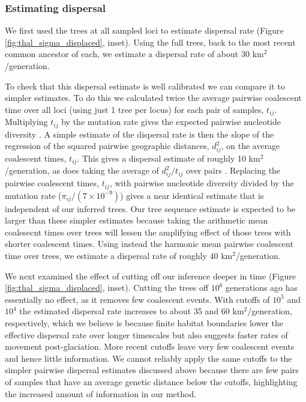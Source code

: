 \documentclass[12pt]{article}
\begin{document}
\subsubsection*{Estimating dispersal}

We first used the trees at all sampled loci to estimate dispersal rate (Figure \ref{fig:thal_sigma_displaced}, inset). 
Using the full trees, back to the most recent common ancestor of each, we estimate a dispersal rate of about $30$ km$^2$/generation. 

To check that this dispersal estimate is well calibrated we can compare it to simpler estimates. 
To do this we calculated twice the average pairwise coalescent time over all loci (using just 1 tree per locus) for each pair of samples, $t_{ij}$.
Multiplying $t_{ij}$ by the mutation rate gives the expected pairwise nucleotide diversity \citep{ralph2020efficiently}.
A simple estimate of the dispersal rate is then the slope of the regression of the squared pairwise geographic distances, $d_{ij}^2$, on the average coalescent times, $t_{ij}$.
This gives a dispersal estimate of roughly 10 km$^2$/generation, as does taking the average of $d_{ij}^2/t_{ij}$ over pairs \citep{ianni2023exploring}.
Replacing the pairwise coalescent times, $t_{ij}$, with pairwise nucleotide diversity divided by the mutation rate ($\pi_{ij}/(7\times10^{-9})$) gives a near identical estimate that is independent of our inferred trees.
Our tree sequence estimate is expected to be larger than these simpler estimates because taking the arithmetic mean coalesecnt times over trees will lessen the amplifying effect of those trees with shorter coalescent times. 
Using instead the harmonic mean pairwise coalescent time over trees, we estimate a dispersal rate of roughly 40 km$^2$/generation. 

We next examined the effect of cutting off our inference deeper in time (Figure \ref{fig:thal_sigma_displaced}, inset). 
Cutting the trees off $10^6$ generations ago has essentially no effect, as it removes few coalescent events.
With cutoffs of $10^5$ and $10^4$ the estimated dispersal rate increases to about 35 and 60 km$^2$/generation, respectively, which we believe is because finite habitat boundaries lower the effective dispersal rate over longer timescales but also suggests faster rates of movement post-glaciation.
More recent cutoffs leave very few coalescent events and hence little information. 
We cannot reliably apply the same cutoffs to the simpler pairwise dispersal estimates discussed above because there are few pairs of samples that have an average genetic distance below the cutoffs, highlighting the increased amount of information in our method.
\end{document}

